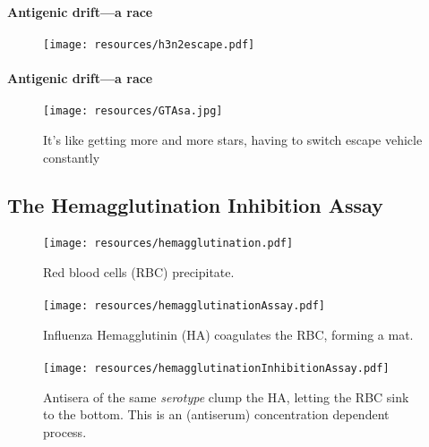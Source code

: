 \documentclass{beamer}
\begin{document}
\begin{darkframes}
    \begin{frame}{\subsecname}
      \framesubtitle{Antigenic drift---a race}
      \begin{figure}
        \texttt{[image: resources/h3n2escape.pdf]}
        \caption{\footnotesize }
      \end{figure}
    \end{frame}

    \begin{frame}{\subsecname}
      \framesubtitle{Antigenic drift---a race}
      \begin{figure}
        \texttt{[image: resources/GTAsa.jpg]}
        \caption{\footnotesize It's like getting more and more stars, having to switch escape vehicle constantly}
      \end{figure}
    \end{frame}




    \subsection{The Hemagglutination Inhibition Assay}

    \begin{frame}{\subsecname}
      \framesubtitle{}
      \begin{figure}
        \texttt{[image: resources/hemagglutination.pdf]}
        \caption{Red blood cells (RBC) precipitate.}
      \end{figure}
    \end{frame}

    \begin{frame}{\subsecname}
      \framesubtitle{}
      \begin{figure}
        \texttt{[image: resources/hemagglutinationAssay.pdf]}
        \caption{Influenza Hemagglutinin (HA) coagulates the RBC, forming a mat.}
      \end{figure}
    \end{frame}

    \begin{frame}{\subsecname}
      \framesubtitle{}
      \begin{figure}
        \texttt{[image: resources/hemagglutinationInhibitionAssay.pdf]}
        \caption{Antisera of the same \textit{serotype} clump the HA, letting the RBC sink to the bottom. This is an (antiserum) concentration dependent process.}
      \end{figure}
    \end{frame}


\end{darkframes}
\end{document}
